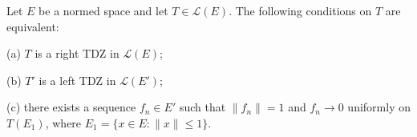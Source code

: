 Let $E$ be a normed space and let $T \in \mathcal{L}(E)$. The following conditions on $T$ are equivalent:

(a) $T$ is a right TDZ in $\mathcal{L}(E)$;

(b) $T'$ is a left TDZ in $\mathcal{L}(E')$;

(c) there exists a sequence $f_n \in E'$ such that $\|f_n\| = 1$ and $f_n \to 0$ uniformly on $T(E_1)$, where $E_1 = \{x \in E : \|x\| \leq 1\}$.
